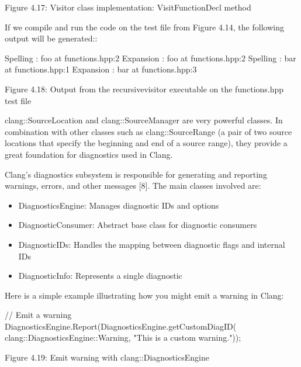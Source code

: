 \begin{center}
Figure 4.17: Visitor class implementation: VisitFunctionDecl method
\end{center}

If we compile and run the code on the test file from Figure 4.14, the following output will be generated::

\begin{shell}
Spelling : foo at functions.hpp:2
Expansion : foo at functions.hpp:2
Spelling : bar at functions.hpp:1
Expansion : bar at functions.hpp:3
\end{shell}

\begin{center}
Figure 4.18: Output from the recursivevisitor executable on the functions.hpp test file
\end{center}

clang::SourceLocation and clang::SourceManager are very powerful classes. In combination with other classes such as clang::SourceRange (a pair of two source locations that specify the beginning and end of a source range), they provide a great foundation for diagnostics used in Clang.


Clang’s diagnostics subsystem is responsible for generating and reporting warnings, errors, and other messages [8]. The main classes involved are:

\begin{itemize}
\item
DiagnosticsEngine: Manages diagnostic IDs and options

\item
DiagnosticConsumer: Abstract base class for diagnostic consumers

\item
DiagnosticIDs: Handles the mapping between diagnostic flags and internal IDs

\item
DiagnosticInfo: Represents a single diagnostic
\end{itemize}

Here is a simple example illustrating how you might emit a warning in Clang:

\begin{cpp}
// Emit a warning
DiagnosticsEngine.Report(DiagnosticsEngine.getCustomDiagID(
  clang::DiagnosticsEngine::Warning, "This is a custom warning."));
\end{cpp}

\begin{center}
Figure 4.19: Emit warning with clang::DiagnosticsEngine
\end{center}

